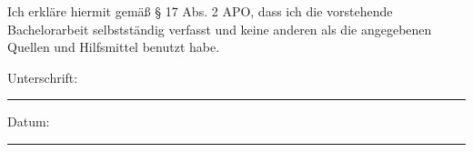 \documentclass[
11pt, %
english, %
singlespacing, %
parskip, %
nohyperref, %
headsepline, %
consistentlayout, %
]{MastersDoctoralThesis} %
\newcommand{\abschluss}{Bachelor}
\begin{document}


\begin{declaration}
\addchaptertocentry{\authorshipname} %
Ich erkläre hiermit gemäß § 17 Abs. 2 APO, dass ich die vorstehende {\abschluss}arbeit selbstständig verfasst und keine anderen als die angegebenen Quellen und Hilfsmittel benutzt habe.


\noindent Unterschrift:\\
\rule[0.5em]{25em}{0.5pt} %

\noindent Datum:\\
\rule[0.5em]{25em}{0.5pt} %
\end{declaration}
\end{document}
